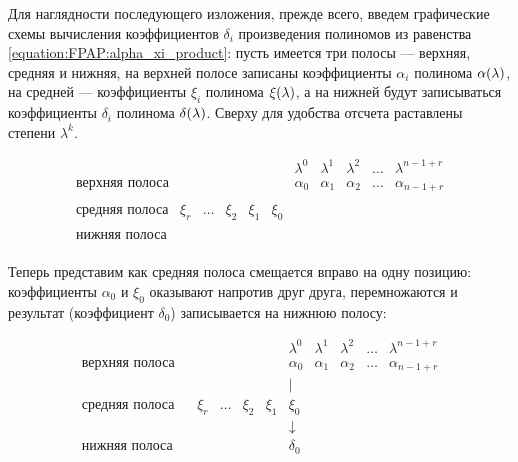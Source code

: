Для наглядности последующего изложения, прежде всего, введем графические схемы вычисления коэффициентов $\delta_i$ произведения полиномов
из равенства \eqref{equation:FPAP:alpha_xi_product}: пусть имеется три полосы --- верхняя, средняя и нижняя, на верхней полосе записаны
коэффициенты $\alpha_i$ полинома $\alpha (\lambda)$, на средней --- коэффициенты $\xi_i$ полинома $\xi (\lambda)$, а на нижней
будут записываться коэффициенты $\delta_i$ полинома $\delta (\lambda)$. Сверху для удобства отсчета раставлены степени $\lambda^k$.

	$$
		\begin{array}{ccccccccccc}
			                      &       &       &       &       &       & \lambda^0 & \lambda^1 & \lambda^2 & \dots & \lambda^{n-1+r} \\
			\hline
			\text{верхняя полоса} &       &       &       &       &       & \alpha_0  & \alpha_1  & \alpha_2  & \dots & \alpha_{n-1+r} \\
			                      &       &       &       &       &       &           &           &           &       & \\
			\text{средняя полоса} & \xi_r & \dots & \xi_2 & \xi_1 & \xi_0 &           &           &           &       & \\
			                      &       &       &       &       &       &           &           &           &       & \\
			\text{нижняя полоса}  &       &       &       &       &       &           &           &           &       & \\
		\end{array}
	$$

Теперь представим как средняя полоса смещается вправо на одну позицию: коэффициенты $\alpha_0$ и $\xi_0$ оказывают напротив друг друга,
перемножаются и результат (коэффициент $\delta_0$) записывается на нижнюю полосу:

	$$
		\begin{array}{ccccccccccc}
			                      &       &       &       &       &       & \lambda^0  & \lambda^1 & \lambda^2 & \dots & \lambda^{n-1+r} \\
			\hline
			\text{верхняя полоса} &       &       &       &       &       & \alpha_0   & \alpha_1  & \alpha_2  & \dots & \alpha_{n-1+r} \\
			                      &       &       &       &       &       & |          &           &           &       & \\
			\text{средняя полоса} &       & \xi_r & \dots & \xi_2 & \xi_1 & \xi_0      &           &           &       & \\
			                      &       &       &       &       &       & \downarrow &           &           &       & \\
			\text{нижняя полоса}  &       &       &       &       &       & \delta_0   &           &           &       & \\
		\end{array}
	$$

